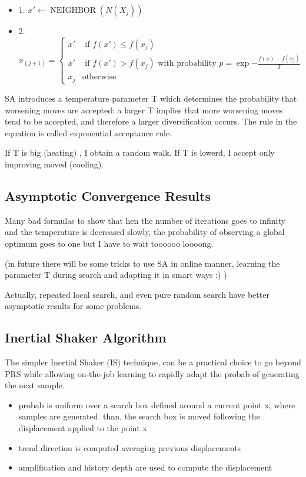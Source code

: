 \documentclass[11pt]{article}
\DeclareMathOperator{\neighbor}{NEIGHBOR}
\begin{document}
\begin{itemize}
\item{1. $x' \leftarrow \neighbor(N(X_j))$}
\item{2. $x_{(j+1)} = \begin{cases} 
      x' & \text{ if } f(x') \leq f(x_j) \\
      x' & \text{ if } f(x') > f(x_j) \text{ with probability } p = \exp{-\frac{f(x)-f(x_j)}{T}} \\
      x_j & \text{otherwise}
   \end{cases}
$}
\end{itemize}

SA introduces a temperature parameter T which determines the probability that worsening moves are accepted:
a larger T implies that more worsening moves tend to be accepted, and therefore a larger diversification occurs. The rule in the equation is called exponential acceptance rule.

If T is big (heating) , I obtain a random walk. If T is lowerd, I accept only improving moved (cooling).

\subsection{Asymptotic Convergence Results}

Many bad formulas to show that hen the number of iterations goes to infinity and the temperature is decreased slowly, the probability of
observing a global optimum goes to one but I have to wait toooooo loooong.

(in future there will be some tricks to use SA in online manner, learning the parameter T during search and adapting it in smart ways :) )

Actually, repeated local search, and even pure random search have better asymptotic results
for some problems.

\subsection{Inertial Shaker Algorithm}
The simpler Inertial Shaker (IS) technique, can be a practical choice to go beyond PRS while allowing on-the-job learning to rapidly adapt the probab of generating the next sample.

\begin{itemize}
\item probab is uniform over a search box defined around a current point x, where samples are generated. than, the search box is moved following the displacement applied to the point x
\item trend direction is computed averaging previous displacements
\item amplification and history depth are used to compute the displacement
\end{itemize}
\end{document}
